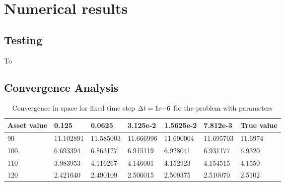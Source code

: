 \section{Numerical results}

\subsection{Testing}

To

\subsection{Convergence Analysis}

\begin{table}[H]
    \begin{tabular}{@{}lllllll@{}}
    \toprule
    Asset value & 0.125  & 0.0625  & 3.125e-2 & 1.5625e-2  & 7.812e-3  & True value     \\ \midrule
    90          & 11.102891 & 11.585003 & 11.666996 & 11.690004 & 11.695703 & 11.6974    \\
    100         & 6.693394  & 6.863127  & 6.915119  & 6.928041  & 6.931177  & 6.9320     \\
    110         & 3.983953  & 4.116267  & 4.146001  & 4.152923  & 4.154515  & 4.1550     \\
    120         & 2.421640  & 2.490109  & 2.506015  & 2.509375  & 2.510070  & 2.5102     \\ \bottomrule
    \end{tabular}
\caption{Convergence in space for fixed time step $\Delta{t} = {1}\mathrm{e}{-6}$ for the problem with parameters}
\end{table}